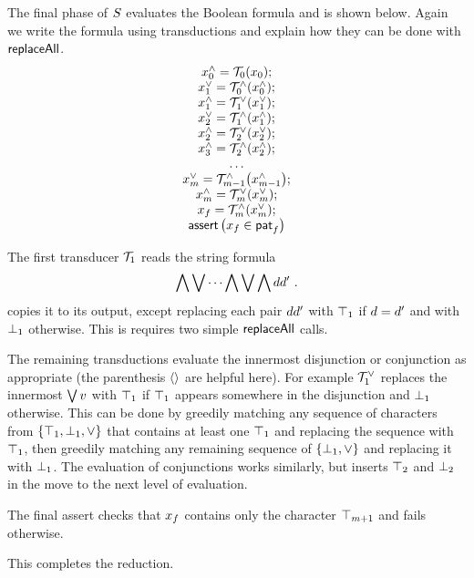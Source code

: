 The final phase of $S$ evaluates the Boolean formula and is shown below.
Again we write the formula using transductions and explain how they can be done
with $\mathsf{replaceAll}$.
\[
    \begin{array}{c}
        x^\land_0 = {\mathcal{T}_0}\mathord{\left(x_0\right)}; \\
        x^\lor_1 = {\mathcal{T}^\land_0}\mathord{\left(x^\land_0\right)}; \\
        x^\land_1 = {\mathcal{T}^\lor_1}\mathord{\left(x^\lor_1\right)}; \\
        x^\lor_2 = {\mathcal{T}^\land_1}\mathord{\left(x^\land_1\right)}; \\
        x^\land_2 = {\mathcal{T}^\lor_2}\mathord{\left(x^\lor_2\right)}; \\
        x^\land_3 = {\mathcal{T}^\land_2}\mathord{\left(x^\land_2\right)}; \\
        \ldots \\
        x^\lor_m
            = {\mathcal{T}^\land_{m-1}}\mathord{\left(x^\land_{m-1}\right)}; \\
        x^\land_m
            = {\mathcal{T}^\lor_m}\mathord{\left(x^\lor_{m}\right)}; \\
        x_f
            = {\mathcal{T}^\land_m}\mathord{\left(x^\lor_{m}\right)}; \\
        \textsf{assert}\left(x_f \in \mathsf{pat}_f\right)
    \end{array}
\]

The first transducer $\mathcal{T}_1$ reads the string formula
\[
    \bigwedge \bigvee \cdots \bigwedge \bigvee \bigwedge d d' \ .
\]
copies it to its output, except replacing each pair
$d d'$
with $\top_{1}$ if $d = d'$ and with $\bot_{1}$ otherwise.
This is requires two simple $\mathsf{replaceAll}$ calls.

The remaining transductions evaluate the innermost disjunction or conjunction as
appropriate (the parenthesis $\left\langle\right\rangle$ are helpful here). For example
$\mathcal{T}^\lor_1$
replaces the innermost
$\bigvee v$
with $\top_{1}$ if $\top_{1}$ appears somewhere in the disjunction and
$\bot_{1}$ otherwise.
This can be done by greedily matching any sequence of characters from
$\{ \top_{1}, \bot_{1}, \lor \}$
that contains at least one $\top_{1}$ and replacing the sequence with $\top_{1}$,
then greedily matching any remaining sequence of
$\{ \bot_{1}, \lor \}$
and replacing it with $\bot_{1}$.
The evaluation of conjunctions works similarly, but inserts $\top_{2}$ and $\bot_{2}$ in the move to the next level of evaluation.

The final assert checks that $x_f$ contains only the character $\top_{m+1}$
and fails otherwise.

This completes the reduction.
